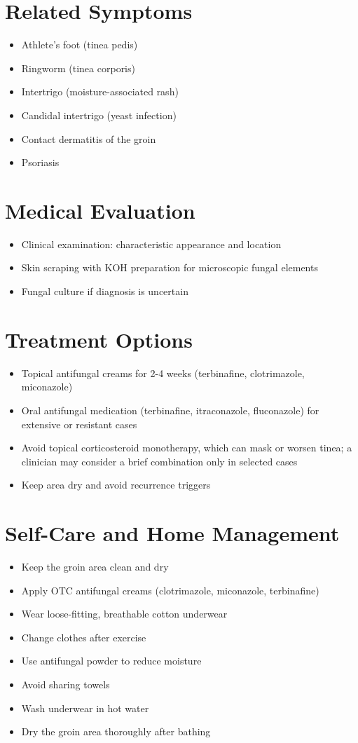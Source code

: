 \section*{Related Symptoms}
\begin{itemize}
\item Athlete's foot (tinea pedis)
\item Ringworm (tinea corporis)
\item Intertrigo (moisture-associated rash)
\item Candidal intertrigo (yeast infection)
\item Contact dermatitis of the groin
\item Psoriasis
\end{itemize}

\section*{Medical Evaluation}
\begin{itemize}
\item Clinical examination: characteristic appearance and location
\item Skin scraping with KOH preparation for microscopic fungal elements
\item Fungal culture if diagnosis is uncertain
\end{itemize}

\section*{Treatment Options}
\begin{itemize}
\item Topical antifungal creams for 2-4 weeks (terbinafine, clotrimazole, miconazole)
\item Oral antifungal medication (terbinafine, itraconazole, fluconazole) for extensive or resistant cases
\item Avoid topical corticosteroid monotherapy, which can mask or worsen tinea; a clinician may consider a brief combination only in selected cases
\item Keep area dry and avoid recurrence triggers
\end{itemize}

\section*{Self-Care and Home Management}
\begin{itemize}
\item Keep the groin area clean and dry
\item Apply OTC antifungal creams (clotrimazole, miconazole, terbinafine)
\item Wear loose-fitting, breathable cotton underwear
\item Change clothes after exercise
\item Use antifungal powder to reduce moisture
\item Avoid sharing towels
\item Wash underwear in hot water
\item Dry the groin area thoroughly after bathing
\end{itemize}


